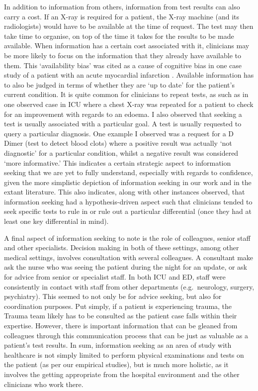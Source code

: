 \documentclass[a4paper, nobind]{templates/ociamthesis}
\begin{document}
\hfill\break
In addition to information from others, information from test results can also carry a cost. If an X-ray is required for a patient, the X-ray machine (and its radiologists) would have to be available at the time of request. The test may then take time to organise, on top of the time it takes for the results to be made available. When information has a certain cost associated with it, clinicians may be more likely to focus on the information that they already have available to them. This `availability bias' was cited as a cause of cognitive bias in one case study of a patient with an acute myocardial infarction \autocite{schlogl_foreign_2018}. Available information has to also be judged in terms of whether they are `up to date' for the patient's current condition. It is quite common for clinicians to repeat tests, as such as in one observed case in ICU where a chest X-ray was repeated for a patient to check for an improvement with regards to an edoema. I also observed that seeking a test is usually associated with a particular goal. A test is usually requested to query a particular diagnosis. One example I observed was a request for a D Dimer (test to detect blood clots) where a positive result was actually `not diagnostic' for a particular condition, whilst a negative result was considered `more informative.' This indicates a certain strategic aspect to information seeking that we are yet to fully understand, especially with regards to confidence, given the more simplistic depiction of information seeking in our work and in the extant literature. This also indicates, along with other instances observed, that information seeking had a hypothesis-driven aspect such that clinicians tended to seek specific tests to rule in or rule out a particular differential (once they had at least one key differential in mind).

\hfill\break
A final aspect of information seeking to note is the role of colleagues, senior staff and other specialists. Decision making in both of these settings, among other medical settings, involves consultation with several colleagues. A consultant make ask the nurse who was seeing the patient during the night for an update, or ask for advice from senior or specialist staff. In both ICU and ED, staff were consistently in contact with staff from other departments (e.g.~neurology, surgery, psychiatry). This seemed to not only be for advice seeking, but also for coordination purposes. Put simply, if a patient is experiencing trauma, the Trauma team likely has to be consulted as the patient case falls within their expertise. However, there is important information that can be gleaned from colleagues through this communication process that can be just as valuable as a patient's test results. In sum, information seeking as an area of study with healthcare is not simply limited to perform physical examinations and tests on the patient (as per our empirical studies), but is much more holistic, as it involves the getting appropriate from the hospital environment and the other clinicians who work there.
\end{document}

